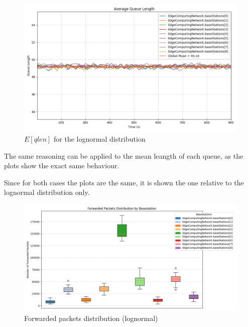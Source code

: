 \documentclass{report}
\begin{document}
\begin{figure}[H]
    \centering
    \includegraphics[width=\textwidth]{img/plots/log_1e4_B/qlen.png}
    \caption{$E[qlen]$ for the lognormal distribution}
\end{figure}


The same reasoning can be applied to the mean leangth of each queue, as the plots show the exact same behaviour.

Since for both cases the plots are the same, it is shown the one relative to the lognormal distribution only.

\begin{figure}[H]
    \centering
    \includegraphics[width=\textwidth]{img/plots/log_1e4_B/forwarded.png}
    \caption{Forwarded packets distribution (lognormal)}
\end{figure}
\end{document}

